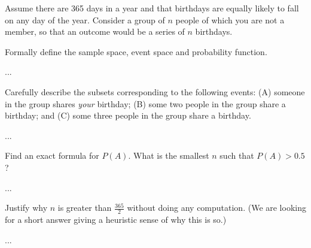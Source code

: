 \documentclass[a4paper,10pt,landscape,twocolumn]{scrartcl}
\begin{document}
\begin{exercise}[Birthdays]
  Assume there are 365 days in a year and that birthdays are equally likely to
  fall on any day of the year. Consider a group of $n$ people of which you are
  not a member, so that an outcome would be a series of $n$ birthdays.
  
  \begin{subex}
    Formally define the sample space, event space and probability function.
  \end{subex}
  
  \begin{solution}
    ...  
  \end{solution}
  
  
  \begin{subex}
    Carefully describe the subsets corresponding to the following events: (A)
    someone in the group shares \emph{your} birthday; (B) some two people in
    the group share a birthday; and (C) some three people in the group share a
    birthday.
  \end{subex}
  
  \begin{solution}
    ...  
  \end{solution}
    
  \begin{subex}
    Find an exact formula for $P(A)$. What is the smallest $n$ such that 
    $P(A) > 0.5$?
  \end{subex}
  
  \begin{solution}
    ...  
  \end{solution}
  
  
  \begin{subex}
    Justify why $n$ is greater than $\frac{3	65}{2}$ without doing any
    computation. (We are looking for a short answer giving a heuristic sense of
    why this is so.)
  \end{subex}
  
  \begin{solution}
    ...  
  \end{solution}
  
\end{exercise}

\end{document}
